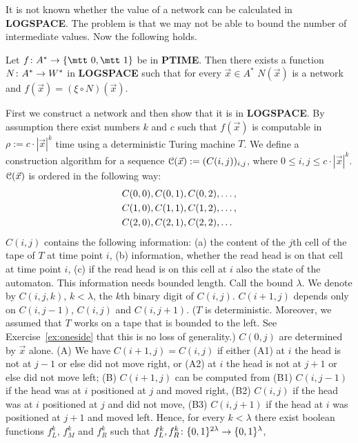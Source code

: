It is not known whether the value of a network can be calculated 
in \textbf{LOG\-SPACE}. The problem is that we may not be able
to bound the number of intermediate values. Now the following holds.
\begin{thm}
Let $f \colon A^{\ast} \pf \{\mbox{\mtt 0},\mbox{\mtt 1}\}$ be in
\textbf{PTIME}. Then there exists a function $N \colon A^{\ast} \rightarrow W^{\ast}$
in \textbf{LOGSPACE} such that for every $\vec{x} \in
A^{\ast}$ $N(\vec{x})$ is a network and $f(\vec{x}) =
(\xi \circ N)(\vec{x})$.
\end{thm}
\proofbeg
First we construct a network and then show that it is in
\textbf{LOGSPACE}. By assumption there exist numbers $k$ and $c$
such that $f(\vec{x})$ is computable in $\rho := c \cdot
|\vec{x}|^k$ time using a deterministic Turing machine $T$.
We define a construction algorithm for a sequence $\mathcal{C}(\vec{x})
:= (C(i,j))_{i,j}$, where $0 \leq i, j \leq c \cdot |\vec{x}|^k$. 
$\mathcal{C}(\vec{x})$ is ordered in the following way:
\begin{align}\notag
& C(0,0), C(0,1), C(0,2), \dotsc, \\
& C(1,0), C(1,1), C(1,2), \dotsc, \\\notag
& C(2,0), C(2,1), C(2,2), \dotsc
\end{align}
$C(i,j)$ contains the following
information: (a) the content of the $j$th cell of the tape
of $T$ at time point $i$, (b) information, whether the read
head is on that cell at time point $i$, (c) if the read head
is on this cell at $i$ also the state of the automaton. This
information needs bounded length. Call the bound $\lambda$.
We denote by $C(i,j,k)$, $k < \lambda$, the $k$th binary digit 
of $C(i,j)$. $C(i+1,j)$ depends only on $C(i,j-1)$, $C(i,j)$ 
and $C(i,j+1)$. ($T$ is deterministic. Moreover, we assumed that 
$T$ works on a tape that is bounded to the left. See 
Exercise~\ref{ex:oneside} that this is no loss of generality.)
$C(0,j)$ are determined by $\vec{x}$ alone.  (A) We have 
$C(i+1,j) = C(i,j)$ if either (A1) at $i$ the head is not at
$j-1$ or else did not move right, or (A2) at $i$ the head is not at
$j+1$ or else did not move left; (B) $C(i+1,j)$ can be computed
from (B1) $C(i,j-1)$ if the head was at $i$ positioned at $j$
and moved right, (B2) $C(i,j)$ if the head was at $i$ positioned
at $j$ and did not move, (B3) $C(i,j+1)$ if the head at $i$ was
positioned at $j+1$ and moved left. Hence, for every $k < \lambda$
there exist boolean functions $f^k_L$, $f^k_M$ and $f^k_R$ such that
$f^k_L, f^k_R \colon \{0,1\}^{2\lambda} \rightarrow \{0,1\}^{\lambda}$,
